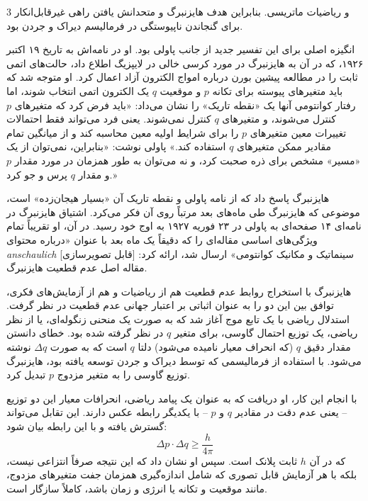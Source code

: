 \documentclass[11pt,a4paper]{article}
\begin{document}
\begin{multicols}{3}
و ریاضیات ماتریسی. بنابراین هدف هایزنبرگ و متحدانش یافتن راهی غیرقابل‌انکار برای گنجاندن ناپیوستگی در فرمالیسم دیراک و جردن بود.

انگیزه اصلی برای این تفسیر جدید از جانب پاولی بود. او در نامه‌اش به تاریخ ۱۹ اکتبر ۱۹۲۶، که در آن به هایزنبرگ در مورد کرسی خالی در لایپزیگ اطلاع داد، حالت‌های اتمی ثابت را در مطالعه پیشین بورن درباره امواج الکترون آزاد اعمال کرد. او متوجه شد که باید متغیرهای پیوسته برای تکانه $p$ و موقعیت $q$ یک الکترون اتمی انتخاب شوند، اما رفتار کوانتومی آنها یک «نقطه تاریک» را نشان می‌داد: «باید فرض کرد که متغیرهای $p$ کنترل می‌شوند، و متغیرهای $q$ کنترل نمی‌شوند. یعنی فرد می‌تواند فقط احتمالات تغییرات معین متغیرهای $p$ را برای شرایط اولیه معین محاسبه کند و از میانگین تمام مقادیر ممکن متغیرهای $q$ استفاده کند.» پاولی نوشت: «بنابراین، نمی‌توان از یک «مسیر» مشخص برای ذره صحبت کرد، و نه می‌توان به طور همزمان در مورد مقدار $p$ و مقدار $q$ پرس و جو کرد.»

هایزنبرگ پاسخ داد که از نامه پاولی و نقطه تاریک آن «بسیار هیجان‌زده» است، موضوعی که هایزنبرگ طی ماه‌های بعد مرتباً روی آن فکر می‌کرد. اشتیاق هایزنبرگ در نامه‌ای ۱۴ صفحه‌ای به پاولی در ۲۳ فوریه ۱۹۲۷ به اوج خود رسید. در آن، او تقریباً تمام ویژگی‌های اساسی مقاله‌ای را که دقیقاً یک ماه بعد با عنوان «درباره محتوای \textit{anschaulich} [قابل تصویرسازی] سینماتیک و مکانیک کوانتومی» ارسال شد، ارائه کرد: مقاله اصل عدم قطعیت هایزنبرگ.

هایزنبرگ با استخراج روابط عدم قطعیت هم از ریاضیات و هم از آزمایش‌های فکری، توافق بین این دو را به عنوان اثباتی بر اعتبار جهانی عدم قطعیت در نظر گرفت. استدلال ریاضی با یک تابع موج آغاز شد که به صورت یک منحنی زنگوله‌ای، یا از نظر ریاضی، یک توزیع احتمال گاوسی، برای متغیر $q$ در نظر گرفته شده بود. خطای دانستن مقدار دقیق $q$ (که انحراف معیار نامیده می‌شود) دلتا $q$ است که به صورت $\Delta q$ نوشته می‌شود. با استفاده از فرمالیسمی که توسط دیراک و جردن توسعه یافته بود، هایزنبرگ توزیع گاوسی را به متغیر مزدوج $p$ تبدیل کرد.

\vspace{0.5em}
\noindent با انجام این کار، او دریافت که به عنوان یک پیامد ریاضی، انحرافات معیار این دو توزیع -- یعنی عدم دقت در مقادیر $q$ و $p$ -- با یکدیگر رابطه عکس دارند. این تقابل می‌تواند گسترش یافته و با این رابطه بیان شود:
$$ \Delta p \cdot \Delta q \ge \frac{h}{4\pi} $$
که در آن $h$ ثابت پلانک است. سپس او نشان داد که این نتیجه صرفاً انتزاعی نیست، بلکه با هر آزمایش قابل تصوری که شامل اندازه‌گیری همزمان جفت متغیرهای مزدوج، مانند موقعیت و تکانه یا انرژی و زمان باشد، کاملاً سازگار است.


\end{multicols}
\end{document}
